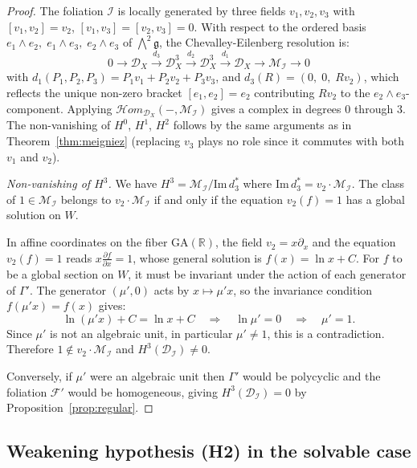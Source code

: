 \documentclass[12pt,a4paper]{article}
\begin{document}
\begin{proof}
The foliation $\mathcal{I}$ is locally generated by three fields
$v_1, v_2, v_3$ with $[v_1,v_2]=v_2$, $[v_1,v_3]=[v_2,v_3]=0$.
With respect to the ordered basis
$e_1\wedge e_2,\; e_1\wedge e_3,\; e_2\wedge e_3$
of $\bigwedge^2\mathfrak{g}$, the Chevalley-Eilenberg resolution is:
\[
0 \to \mathcal{D}_X
\xrightarrow{d_3} \mathcal{D}_X^3
\xrightarrow{d_2} \mathcal{D}_X^3
\xrightarrow{d_1} \mathcal{D}_X
\to \mathcal{M}_{\mathcal{I}} \to 0
\]
with $d_1(P_1,P_2,P_3) = P_1v_1 + P_2v_2 + P_3v_3$, and
$d_3(R) = (0,\; 0,\; Rv_2)$,
which reflects the unique non-zero bracket $[e_1,e_2]=e_2$ contributing
$Rv_2$ to the $e_2\wedge e_3$-component.
Applying
$\mathcal{H}om_{\mathcal{D}_X}(-,\mathcal{M}_{\mathcal{I}})$ gives a
complex in degrees $0$ through $3$. The non-vanishing of $H^0$, $H^1$,
$H^2$ follows by the same arguments as in Theorem~\ref{thm:meigniez}
(replacing $v_3$ plays no role since it commutes with both $v_1$ and $v_2$).

\smallskip
\textit{Non-vanishing of $H^3$.}
We have
$H^3 = \mathcal{M}_{\mathcal{I}} / \mathrm{Im}\, d_3^*$
where $\mathrm{Im}\, d_3^* = v_2 \cdot \mathcal{M}_{\mathcal{I}}$.
The class of $1 \in \mathcal{M}_{\mathcal{I}}$ belongs to
$v_2 \cdot \mathcal{M}_{\mathcal{I}}$ if and only if the equation
$v_2(f) = 1$ has a global solution on $W$.

In affine coordinates on the fiber $\mathrm{GA}(\mathbb{R})$, the field
$v_2 = x\partial_x$ and the equation $v_2(f) = 1$ reads
$x \frac{\partial f}{\partial x} = 1$,
whose general solution is $f(x) = \ln x + C$.
For $f$ to be a global section on $W$, it must be invariant under the
action of each generator of $\Gamma'$. The generator $(\mu', 0)$ acts by
$x \mapsto \mu' x$, so the invariance condition $f(\mu' x) = f(x)$ gives:
\[
\ln(\mu' x) + C = \ln x + C
\quad \Rightarrow \quad
\ln \mu' = 0
\quad \Rightarrow \quad
\mu' = 1.
\]
Since $\mu'$ is not an algebraic unit, in particular $\mu' \neq 1$,
this is a contradiction. Therefore $1 \notin v_2 \cdot \mathcal{M}_{\mathcal{I}}$
and $H^3(\mathcal{D}_{\mathcal{I}}) \neq 0$.

Conversely, if $\mu'$ were an algebraic unit then $\Gamma'$ would be
polycyclic and the foliation $\mathcal{F}'$ would be homogeneous, giving
$H^3(\mathcal{D}_{\mathcal{I}}) = 0$ by Proposition~\ref{prop:regular}.
\end{proof}

\subsection{Weakening hypothesis (H2) in the solvable case}
\end{document}
